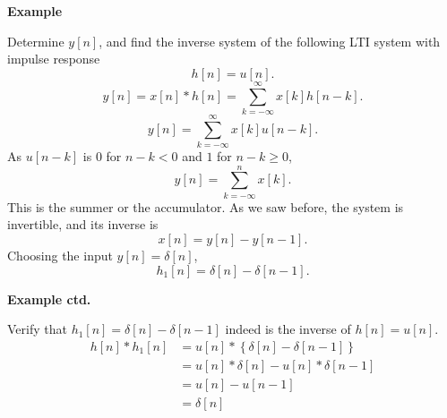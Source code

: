 \begin{frame}{}
    \textbf{Example}\par
    Determine $y[n]$, and find the inverse system of the following LTI system with impulse response
    \begin{equation*}
        h[n] = u[n].
    \end{equation*}
    \pause
    {
        \begin{equation*}
            y[n] = x[n]\ast h[n] = \sum_{k=-\infty}^{\infty}x[k]h[n-k].
        \end{equation*}
        \pause
        \begin{equation*}
            y[n] = \sum_{k=-\infty}^{\infty}x[k]u[n-k].
        \end{equation*}
        As $u[n-k]$ is $0$ for $n-k < 0$ and $1$ for $n-k \geq 0$,
        \begin{equation*}
            y[n] = \sum_{k=-\infty}^{n}x[k].
        \end{equation*}
        \pause
        This is the summer or the accumulator. As we saw before, the system is invertible, and its inverse is
        \begin{equation*}
            x[n] = y[n] - y[n-1].
        \end{equation*}
        \pause
        Choosing the input $y[n] = \delta[n]$,
        \begin{equation*}
            h_1[n] = \delta[n] - \delta[n-1].
        \end{equation*}
    }
\end{frame}

\begin{frame}
    \noindent\textbf{Example ctd.}\par
    Verify that $h_1[n] = \delta[n] - \delta[n-1]$ indeed is the inverse of $h[n] = u[n]$.
    \pause
    \begin{align*}
        h[n]\ast h_1[n]  &= u[n]\ast\left\{\delta[n] - \delta[n-1]\right\}\\
        &= u[n]\ast \delta[n] - u[n]\ast \delta[n-1]\\
        &= u[n] - u[n-1]\\
        &= \delta[n]
    \end{align*}
\end{frame}


